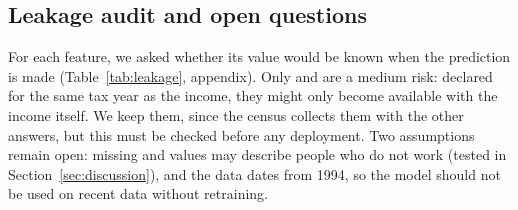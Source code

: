 \subsection{Leakage audit and open questions}

For each feature, we asked whether its value would be known when the
prediction is made (Table~\ref{tab:leakage}, appendix). Only
 and  are a medium risk: declared for the
same tax year as the income, they might only become available with the income
itself. We keep them, since the census collects them with the other answers,
but this must be checked before any deployment. Two assumptions remain open: missing
 and  values may describe people who do not
work (tested in Section~\ref{sec:discussion}), and the data dates from 1994, so
the model should not be used on recent data without retraining.
